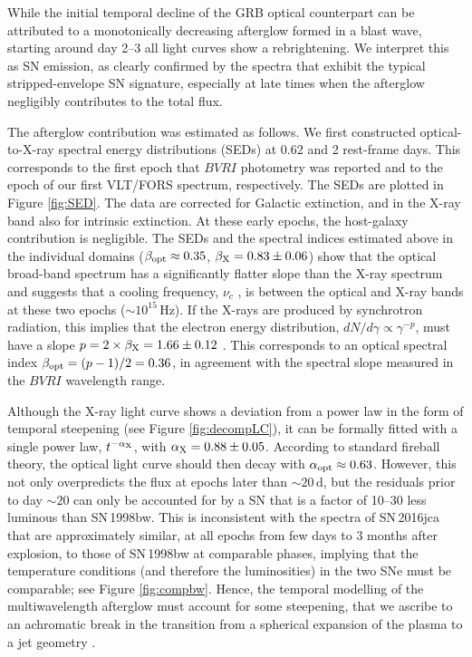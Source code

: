 \documentclass[fleqn,usenatbib]{mnras}
\begin{document}
While the initial temporal decline of the GRB optical counterpart can be attributed to a monotonically decreasing afterglow formed in a  blast wave,  starting around day 2--3  all light curves  show a rebrightening. We interpret this as SN emission, as clearly confirmed by the spectra that exhibit the typical stripped-envelope SN signature, especially at late times when the afterglow negligibly contributes to the total flux. 

The afterglow contribution was estimated  as follows.
We first constructed optical-to-X-ray spectral energy distributions (SEDs) at 0.62 and
2 rest-frame days. This corresponds to the first epoch that $BVRI$ photometry was reported and to the epoch of our 
first VLT/FORS spectrum, respectively. The SEDs are plotted in
Figure \ref{fig:SED}. The data are corrected for Galactic extinction, and in the X-ray band also for intrinsic extinction.  At these early epochs, the host-galaxy contribution is negligible. The SEDs and the spectral indices  estimated above in the individual domains ($\beta_{\rm opt} \approx 0.35$, $\beta_{\rm X} = 0.83 \pm 0.06$)  show that the optical broad-band spectrum has a significantly flatter slope than the X-ray spectrum and suggests that a cooling frequency, $\nu_c$
\citep{Sari98}, is between the optical and X-ray bands at these two epochs ($\sim 10^{15}$\,Hz). If the X-rays are produced by synchrotron
radiation, this implies that the electron energy distribution, $dN/d\gamma \propto \gamma^{-p}$, must have a 
slope $p = 2 \times \beta_{\rm X} = 1.66 \pm 0.12$ 
\citep{Sari98,Zhang04}.  
This corresponds to an optical spectral index $\beta_{\rm opt} = (p - 1)/2 = 0.36$,
in agreement with the spectral slope measured
in the $BVRI$ wavelength range.

Although the X-ray light curve  shows a deviation from a power law in the form of temporal steepening (see Figure \ref{fig:decompLC}),  it can be formally fitted with a single power law, $t^{-\alpha_{\rm X}}$, 
with $\alpha_{\rm X} = 0.88 \pm 0.05$.  According to standard fireball theory, the optical light curve should then decay with 
$\alpha_{\rm opt} \approx 0.63$.   However, this not only overpredicts the flux at epochs later than $\sim 20$\,d, but the residuals prior to day $\sim 20$ can only be accounted for by a SN that is a factor of 10--30 less luminous than SN\,1998bw. This is inconsistent with the spectra of SN\,2016jca that are approximately similar, at all epochs from few days to 3 months after explosion, to those of SN\,1998bw at comparable phases, implying that the temperature conditions (and therefore the luminosities) in the two SNe must be comparable; see Figure \ref{fig:compbw}.  Hence, the temporal modelling of the  multiwavelength afterglow must  account for some steepening, that we ascribe  to an achromatic  break in the  transition from a spherical expansion of the plasma to a jet geometry \citep{Sari99,Rhoads99}.
\end{document}
